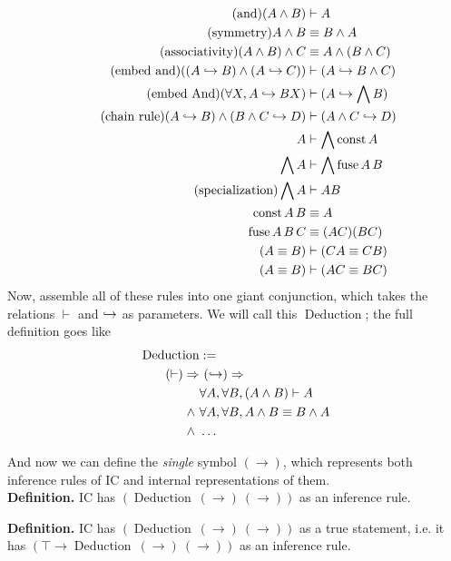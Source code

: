 \documentclass{article}
\begin{document}
  \begin{align*}
    \tag{and}
    (A \wedge B) &\vdash A\\
    \tag{symmetry}
    A \wedge B &\equiv B \wedge A\\
    \tag{associativity}
    (A \wedge B) \wedge C &\equiv A \wedge (B \wedge C)\\
    \tag{embed and}
    ((A \hookrightarrow B) \wedge (A \hookrightarrow C)) &\vdash (A \hookrightarrow B \wedge C)\\
    \tag{embed And}
    (\forall X, A \hookrightarrow B X) &\vdash (A \hookrightarrow \bigwedge B)\\
    \tag{chain rule}
    (A \hookrightarrow B) \wedge (B \wedge C \hookrightarrow D) &\vdash (A \wedge C \hookrightarrow D)\\
    A &\vdash \bigwedge \operatorname{\mathrm{const}} A\\
    \bigwedge A &\vdash \bigwedge \operatorname{\mathrm{fuse}} A\,B\\
    \tag{specialization}
    \bigwedge A &\vdash AB\\
    \operatorname{\mathrm{const}} A\,B &\equiv A\\
    \operatorname{\mathrm{fuse}} A\,B\,C &\equiv (AC)(BC)\\
    (A \equiv B) &\vdash (CA \equiv CB)\\
    (A \equiv B) &\vdash (AC \equiv BC)\\
  \end{align*}
  \newcommand{\deduction}{\operatorname{\mathrm{Deduction}}}
  Now, assemble all of these rules into one giant conjunction, which takes the relations $\vdash$ and $\hookrightarrow$ as parameters. We will call this $\deduction$; the full definition goes like
  \begin{align*}
    \deduction& :=\\
    \nameabst{(\vdash)}&\ \nameabst{(\objto)}\\
    &\forall A, \forall B, (A \wedge B) \vdash A\\
    \wedge\ &\forall A, \forall B, A \wedge B \equiv B \wedge A\\
    \wedge\ &\dots\\
  \end{align*}
  
  And now we can define the \emph{single} symbol $(\to)$, which represents both inference rules of IC and internal representations of them.
  \\
  
  \textbf{Definition.} IC has $(\deduction\ (\to)\ (\to))$ as an inference rule.
  
  \textbf{Definition.} IC has $(\deduction\ (\to)\ (\to))$ as a true statement, i.e. it has $(\top \to \deduction\ (\to)\ (\to))$ as an inference rule.
  \\
  
\end{document}
